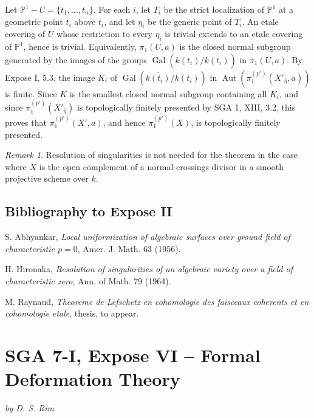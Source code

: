 \documentclass[11pt]{article}
\theoremstyle{plain}
\theoremstyle{definition}
\theoremstyle{remark}
\newtheorem{remark}[theorem]{Remark}
\DeclareMathOperator{\Aut}{Aut}
\begin{document}
Let $\mathbb P^1-U=\{t_1,\ldots,t_n\}$. For each $i$, let $T_i$ be the strict localization of $\mathbb P^1$ at a geometric point $\bar t_i$ above $t_i$, and let $\eta_i$ be the generic point of $T_i$. An etale covering of $U$ whose restriction to every $\eta_i$ is trivial extends to an etale covering of $\mathbb P^1$, hence is trivial. Equivalently, $\pi_1(U,a)$ is the closed normal subgroup generated by the images of the groups $\operatorname{Gal}(\overline{k(t_i)}/k(t_i))$ in $\pi_1(U,a)$. By Expose I, 5.3, the image $K_i$ of $\operatorname{Gal}(\overline{k(t_i)}/k(t_i))$ in $\Aut(\pi_1^{(p')}(X'_{\bar\eta},a))$ is finite. Since $K$ is the smallest closed normal subgroup containing all $K_i$, and since $\pi_1^{(p')}(X'_{\bar\eta})$ is topologically finitely presented by SGA 1, XIII, 3.2, this proves that $\pi_1^{(p')}(X',a)$, and hence $\pi_1^{(p')}(X)$, is topologically finitely presented.

\begin{remark}
Resolution of singularities is not needed for the theorem in the case where $X$ is the open complement of a normal-crossings divisor in a smooth projective scheme over $k$.
\end{remark}

\subsection*{Bibliography to Expose II}
\begin{enumerate}[label={\textup{[\arabic*]}}]
\item S. Abhyankar, \emph{Local uniformization of algebraic surfaces over ground field of characteristic $p=0$}, Amer. J. Math. 63 (1956).
\item H. Hironaka, \emph{Resolution of singularities of an algebraic variety over a field of characteristic zero}, Ann. of Math. 79 (1964).
\item M. Raynaud, \emph{Theoreme de Lefschetz en cohomologie des faisceaux coherents et en cohomologie etale}, thesis, to appear.
\end{enumerate}

\clearpage
\section*{SGA 7-I, Expose VI -- Formal Deformation Theory}

\begin{flushright}
\textit{by D. S. Rim}
\end{flushright}
\end{document}
